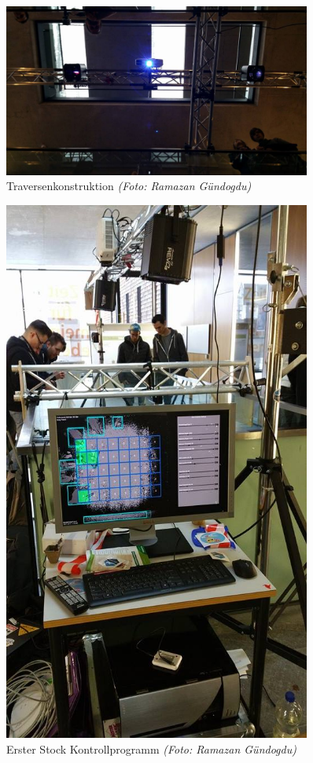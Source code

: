 \begin{figure}[htbp]
	\centering
		\includegraphics[width=0.9\textwidth]{images/TdM3.jpg}
	\caption{Traversenkonstruktion \textit{(Foto: Ramazan Gündogdu)}}
	\label{fig:TdM3}
\end{figure}

\begin{figure}[htbp]
	\centering
		\includegraphics[width=0.9\textwidth]{images/TdM4.jpg}
	\caption{Erster Stock Kontrollprogramm \textit{(Foto: Ramazan Gündogdu)}}
	\label{fig:TdM4}
\end{figure}

